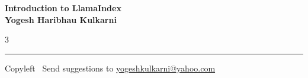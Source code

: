 \documentclass[8pt,landscape]{article}
\begin{document}
\footnotesize


\begin{center}
\Large{\textbf{Introduction to LlamaIndex\\ Yogesh Haribhau Kulkarni}}
\end{center}

\begin{multicols}{3}

\end{multicols}

\rule{\linewidth}{0.25pt}
\scriptsize
Copyleft \textcopyleft\  Send suggestions to
\href{http://www.yogeshkulkarni.com}{yogeshkulkarni@yahoo.com}
\end{document}

